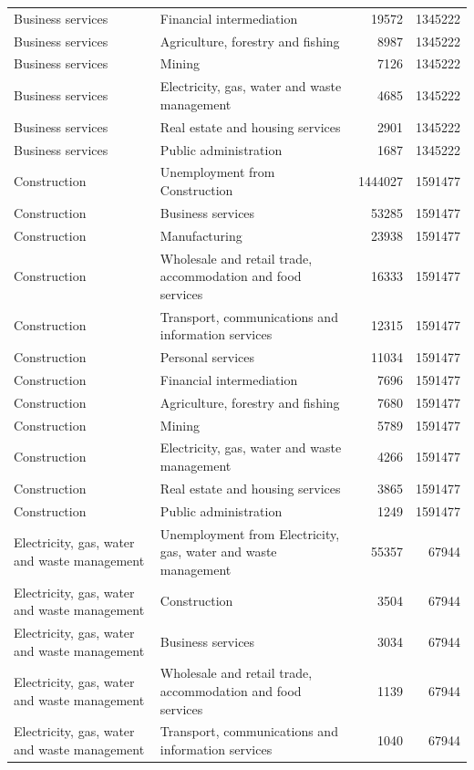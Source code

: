 \begin{longtable}{llrr}
Business services & Financial intermediation & 19572 & 1345222 \\
Business services & Agriculture, forestry and fishing & 8987 & 1345222 \\
Business services & Mining & 7126 & 1345222 \\
Business services & Electricity, gas, water and waste management & 4685 & 1345222 \\
Business services & Real estate and housing services & 2901 & 1345222 \\
Business services & Public administration & 1687 & 1345222 \\
Construction & Unemployment from Construction & 1444027 & 1591477 \\
Construction & Business services & 53285 & 1591477 \\
Construction & Manufacturing & 23938 & 1591477 \\
Construction & Wholesale and retail trade, accommodation and food services & 16333 & 1591477 \\
Construction & Transport, communications and information services & 12315 & 1591477 \\
Construction & Personal services & 11034 & 1591477 \\
Construction & Financial intermediation & 7696 & 1591477 \\
Construction & Agriculture, forestry and fishing & 7680 & 1591477 \\
Construction & Mining & 5789 & 1591477 \\
Construction & Electricity, gas, water and waste management & 4266 & 1591477 \\
Construction & Real estate and housing services & 3865 & 1591477 \\
Construction & Public administration & 1249 & 1591477 \\
Electricity, gas, water and waste management & Unemployment from Electricity, gas, water and waste management & 55357 & 67944 \\
Electricity, gas, water and waste management & Construction & 3504 & 67944 \\
Electricity, gas, water and waste management & Business services & 3034 & 67944 \\
Electricity, gas, water and waste management & Wholesale and retail trade, accommodation and food services & 1139 & 67944 \\
Electricity, gas, water and waste management & Transport, communications and information services & 1040 & 67944 \\

\end{longtable}
